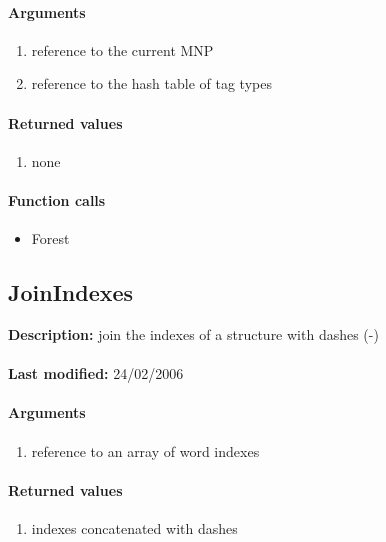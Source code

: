 \paragraph{Arguments}
\begin{enumerate}
\item reference to the current MNP
\item reference to the hash table of tag types
\end{enumerate}

\paragraph{Returned values}
\begin{enumerate}
\item none
\end{enumerate}

\paragraph{Function calls}
\begin{itemize}
\item Forest
\end{itemize}

\subsection{JoinIndexes}
\textbf{Description:} join the indexes of a structure with dashes (-)\\
\\\textbf{Last modified:} 24/02/2006

\paragraph{Arguments}
\begin{enumerate}
\item reference to an array of word indexes
\end{enumerate}

\paragraph{Returned values}
\begin{enumerate}
\item indexes concatenated with dashes
\end{enumerate}

